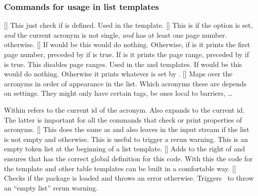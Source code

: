 \documentclass{acro-manual}
\begin{document}
\subsubsection{Commands for usage in list templates}
\begin{commands}
  \expandable{}[]
    This just check if  is defined.  Used in the 
    template.
  \expandable{}[]
    This is  if the option \code{/}
    is set, \emph{and} the current acronym is not single, \emph{and} has at
    least one page number.   otherwise.
  []
    If  would be  this would do nothing.
    Otherwise, if \code{/} is  it
    prints the first page number, preceded by  if
    \code{/} is true.  If
    \code{/} is  it prints the page
    range, preceded by  if \code{/} is
    true.
    This disables page ranges.  Used in the  and 
    templates.
    If  would be  this would do
    nothing. Otherwise it prints whatever is set by
    \code{/}.
  []
    Maps over the acronyms in order of appearance in the list.  Which acronyms
    these are depends on settings.  They might only have certain tags, be ones
    local to barriers, \dots \par
    Within   refers to the current \ac{id} of the
    acronym.  Also  expands to the current \ac{id}.  The latter
    is important for all the commands that check or print properties of
    acronyms.
  []
    This does the same as  and also leaves  in the
    input stream if the list is not empty and  otherwise.  This is
    useful to trigger a rerun warning.
    This is an empty token list at the beginning of a list template.
  []
    Adds  to the right of  and ensures that
     has the correct global definition for this code.  With this
    the code for the  template and other table templates can
    be built in a comfortable way.
  []
    Checks if the package  is loaded and throws an error
    otherwise.
    Triggers \acro\ to throw an \enquote{empty list} rerun warning.
\end{commands}
\end{document}
